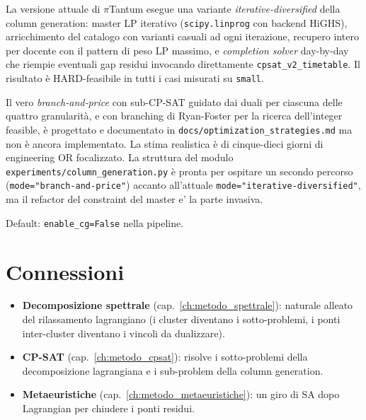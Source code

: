 \begin{avvertenzabox}
La versione attuale di $\pi$Tantum esegue una variante
\emph{iterative-diversified} della column generation: master
LP iterativo (\texttt{scipy.linprog} con backend HiGHS),
arricchimento del catalogo con varianti casuali ad ogni
iterazione, recupero intero per docente con il pattern di
peso LP massimo, e \emph{completion solver} day-by-day che
riempie eventuali gap residui invocando direttamente
\texttt{cpsat\_v2\_timetable}. Il risultato \`e
HARD-feasibile in tutti i casi misurati su \texttt{small}.

Il vero \emph{branch-and-price} con sub-CP-SAT guidato dai
duali per ciascuna delle quattro granularit\`a, e con
branching di Ryan-Foster per la ricerca dell'integer feasible,
\`e progettato e documentato in
\texttt{docs/optimization\_strategies.md} ma non \`e ancora
implementato. La stima realistica \`e di cinque-dieci
giorni di engineering OR focalizzato. La struttura del
modulo \texttt{experiments/column\_generation.py} \`e
pronta per ospitare un secondo percorso
(\texttt{mode="branch-and-price"}) accanto all'attuale
\texttt{mode="iterative-diversified"}, ma il refactor del
constraint del master e' la parte invasiva.

Default: \texttt{enable\_cg=False} nella pipeline.
\end{avvertenzabox}

\section{Connessioni}

\begin{connessionebox}
\begin{itemize}
\item \textbf{Decomposizione spettrale}
  (cap.~\ref{ch:metodo_spettrale}): naturale alleato del
  rilassamento lagrangiano (i cluster diventano i
  sotto-problemi, i ponti inter-cluster diventano i vincoli
  da dualizzare).
\item \textbf{CP-SAT} (cap.~\ref{ch:metodo_cpsat}): risolve i
  sotto-problemi della decomposizione lagrangiana e i
  sub-problem della column generation.
\item \textbf{Metaeuristiche}
  (cap.~\ref{ch:metodo_metaeuristiche}): un giro di SA dopo
  Lagrangian per chiudere i ponti residui.
\end{itemize}
\end{connessionebox}

